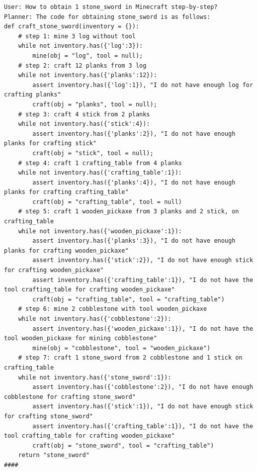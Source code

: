 \begin{lstlisting}
User: How to obtain 1 stone_sword in Minecraft step-by-step?
Planner: The code for obtaining stone_sword is as follows:
def craft_stone_sword(inventory = {}):
    # step 1: mine 3 log without tool
    while not inventory.has({'log':3}):
        mine(obj = "log", tool = null); 
    # step 2: craft 12 planks from 3 log
    while not inventory.has({'planks':12}):
        assert inventory.has({'log':1}), "I do not have enough log for crafting planks"
        craft(obj = "planks", tool = null);
    # step 3: craft 4 stick from 2 planks
    while not inventory.has({'stick':4}):
        assert inventory.has({'planks':2}), "I do not have enough planks for crafting stick"
        craft(obj = "stick", tool = null);
    # step 4: craft 1 crafting_table from 4 planks
    while not inventory.has({'crafting_table':1}):
        assert inventory.has({'planks':4}), "I do not have enough planks for crafting crafting_table"
        craft(obj = "crafting_table", tool = null)
    # step 5: craft 1 wooden_pickaxe from 3 planks and 2 stick, on crafting_table
    while not inventory.has({'wooden_pickaxe':1}):
        assert inventory.has({'planks':3}), "I do not have enough planks for crafting wooden_pickaxe"
        assert inventory.has({'stick':2}), "I do not have enough stick for crafting wooden_pickaxe"
        assert inventory.has({'crafting_table':1}), "I do not have the tool crafting_table for crafting wooden_pickaxe"
        craft(obj = "crafting_table", tool = "crafting_table")
    # step 6: mine 2 cobblestone with tool wooden_pickaxe
    while not inventory.has({'cobblestone':2}):
        assert inventory.has({'wooden_pickaxe':1}), "I do not have the tool wooden_pickaxe for mining cobblestone"
        mine(obj = "cobblestone", tool = "wooden_pickaxe")
    # step 7: craft 1 stone_sword from 2 cobblestone and 1 stick on crafting_table
    while not inventory.has({'stone_sword':1}):
        assert inventory.has({'cobblestone':2}), "I do not have enough cobblestone for crafting stone_sword"
        assert inventory.has({'stick':1}), "I do not have enough stick for crafting stone_sword"
        assert inventory.has({'crafting_table':1}), "I do not have the tool crafting_table for crafting wooden_pickaxe"
        craft(obj = "stone_sword", tool = "crafting_table")
    return "stone_sword"
####

\end{lstlisting}


